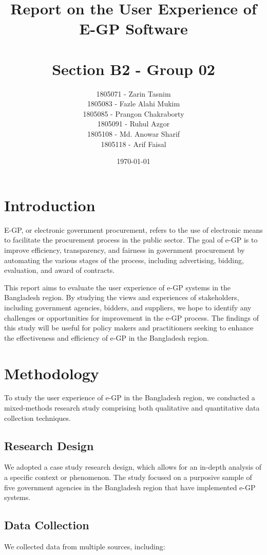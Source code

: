 \documentclass{report}
\title{Report on the User Experience of E-GP Software \\ \\ \large Section B2 - Group 02}
\author{1805071 - Zarin Tasnim \\ 1805083 - Fazle Alahi Mukim \\ 1805085 - Prangon Chakraborty \\  
1805091 - Ruhul Azgor \\ 1805108 - Md. Anowar Sharif \\ 1805118 - Arif Faisal }
\date{\today}
\begin{document}
\maketitle

\section{Introduction}

E-GP, or electronic government procurement, refers to the use of electronic means to facilitate the procurement process in the public sector. The goal of e-GP is to improve efficiency, transparency, and fairness in government procurement by automating the various stages of the process, including advertising, bidding, evaluation, and award of contracts.

This report aims to evaluate the user experience of e-GP systems in the Bangladesh region. By studying the views and experiences of stakeholders, including government agencies, bidders, and suppliers, we hope to identify any challenges or opportunities for improvement in the e-GP process. The findings of this study will be useful for policy makers and practitioners seeking to enhance the effectiveness and efficiency of e-GP in the Bangladesh region.


\section{Methodology}

To study the user experience of e-GP in the Bangladesh region, we conducted a mixed-methods research study comprising both qualitative and quantitative data collection techniques.

\subsection{Research Design}

We adopted a case study research design, which allows for an in-depth analysis of a specific context or phenomenon. The study focused on a purposive sample of five government agencies in the Bangladesh region that have implemented e-GP systems.

\subsection{Data Collection}

We collected data from multiple sources, including:
\end{document}
